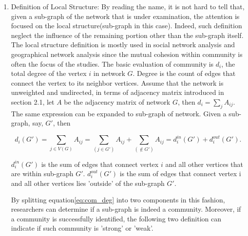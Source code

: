\documentclass[12pt]{article}
\begin{document}
\bigbreak 

\begin{enumerate}[label=(\roman*)]
\item
    Definition of Local Structure: By reading the name, it is not hard to tell that, given a sub-graph of the network that is under examination, the attention is focused on the local structure(sub-graph in this case). Indeed, such definition neglect the influence of the remaining portion other than the sub-graph itself. The local structure definition is mostly used in social network analysis \cite{17} and geographical network analysis \cite{18} since the mutual cohesion within community is often the focus of the studies. The basic evaluation of community is $d_i$, the total degree of the vertex $i$ in network $G$. Degree is the count of edges that connect the vertex to its neighbor vertices. Assume that the network is unweighted and undirected, in terms of adjacency matrix introduced in section 2.1, let $A$ be the adjacency matrix of network $G$, then $d_i = \sum_{j} A_{ij}$. The same expression can be expanded to sub-graph of network. Given a sub-graph, say, $G'$, then 
    
    \begin{equation}\label{eq:com_deg}
    d_i(G') = \sum_{j \in V(G)} A_{ij} = \sum_{(j\in G')} A_{ij} + \sum_{(\notin G')} A_{ij} = d_i^{in}(G') + d_i^{out}(G').
    \end{equation}
    
    $d_i^{in}(G')$ is the sum of edges that connect vertex $i$ and all other vertices that are within sub-graph $G'$. $d_i^{out}(G')$ is the sum of edges that connect vertex i and all other vertices lies 'outside' of the sub-graph $G'$. 
     
    \bigbreak
     
    By splitting equation\eqref{eq:com_deg} into two components in this fashion, researchers can determine if a sub-graph is indeed a community. Moreover, if a community is successfully identified, the following two definition can indicate if such community is 'strong' or 'weak'.
    

\end{enumerate}
\end{document}
